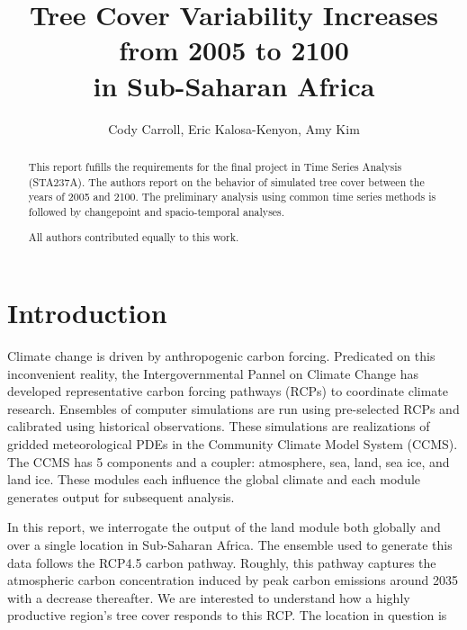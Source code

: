 \documentclass[11pt]{article}
\title{Tree Cover Variability Increases from 2005 to 2100\\ in Sub-Saharan Africa}
\author{Cody Carroll, Eric Kalosa-Kenyon, Amy Kim}
\begin{document}
\maketitle

\begin{abstract}
This report fufills the requirements for the final project in Time Series
    Analysis (STA237A). The authors report on the behavior of simulated tree
    cover between the years of 2005 and 2100. The preliminary analysis using
    common time series methods is followed by changepoint and spacio-temporal
    analyses.

    All authors contributed equally to this work.
\end{abstract}

\section{Introduction}
Climate change is driven by anthropogenic carbon forcing. Predicated on this
inconvenient reality, the Intergovernmental Pannel on Climate Change has
developed representative carbon forcing pathways (RCPs) to coordinate
climate research. Ensembles of computer simulations are run using pre-selected
RCPs and calibrated using historical observations. These simulations are
realizations of gridded meteorological PDEs in the Community Climate Model
System (CCMS). The CCMS has 5 components and a coupler: atmosphere, sea, land,
sea ice, and land ice. These modules each influence the global climate and each
module generates output for subsequent analysis.

In this report, we interrogate the output of the land module both globally and
over a single location in Sub-Saharan Africa. The ensemble used to generate this
data follows the RCP4.5 carbon pathway. Roughly, this pathway captures the
atmospheric carbon concentration induced by peak carbon emissions around 2035
with a decrease thereafter. We are interested to understand how a highly
productive region's tree cover responds to this RCP. The location in question is 
\end{document}
